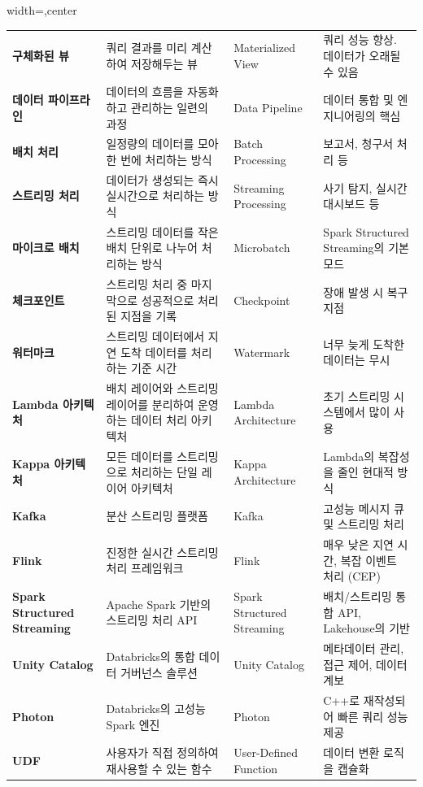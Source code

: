 \documentclass[11pt,a4paper]{article}
\begin{document}
\begin{adjustbox}{width=\textwidth,center}
\begin{tabular}{llll}
\textbf{구체화된 뷰} & 쿼리 결과를 미리 계산하여 저장해두는 뷰 & Materialized View & 쿼리 성능 향상. 데이터가 오래될 수 있음 \\
\textbf{데이터 파이프라인} & 데이터의 흐름을 자동화하고 관리하는 일련의 과정 & Data Pipeline & 데이터 통합 및 엔지니어링의 핵심 \\
\textbf{배치 처리} & 일정량의 데이터를 모아 한 번에 처리하는 방식 & Batch Processing & 보고서, 청구서 처리 등 \\
\textbf{스트리밍 처리} & 데이터가 생성되는 즉시 실시간으로 처리하는 방식 & Streaming Processing & 사기 탐지, 실시간 대시보드 등 \\
\textbf{마이크로 배치} & 스트리밍 데이터를 작은 배치 단위로 나누어 처리하는 방식 & Microbatch & Spark Structured Streaming의 기본 모드 \\
\textbf{체크포인트} & 스트리밍 처리 중 마지막으로 성공적으로 처리된 지점을 기록 & Checkpoint & 장애 발생 시 복구 지점 \\
\textbf{워터마크} & 스트리밍 데이터에서 지연 도착 데이터를 처리하는 기준 시간 & Watermark & 너무 늦게 도착한 데이터는 무시 \\
\textbf{Lambda 아키텍처} & 배치 레이어와 스트리밍 레이어를 분리하여 운영하는 데이터 처리 아키텍처 & Lambda Architecture & 초기 스트리밍 시스템에서 많이 사용 \\
\textbf{Kappa 아키텍처} & 모든 데이터를 스트리밍으로 처리하는 단일 레이어 아키텍처 & Kappa Architecture & Lambda의 복잡성을 줄인 현대적 방식 \\
\textbf{Kafka} & 분산 스트리밍 플랫폼 & Kafka & 고성능 메시지 큐 및 스트리밍 처리 \\
\textbf{Flink} & 진정한 실시간 스트리밍 처리 프레임워크 & Flink & 매우 낮은 지연 시간, 복잡 이벤트 처리 (CEP) \\
\textbf{Spark Structured Streaming} & Apache Spark 기반의 스트리밍 처리 API & Spark Structured Streaming & 배치/스트리밍 통합 API, Lakehouse의 기반 \\
\textbf{Unity Catalog} & Databricks의 통합 데이터 거버넌스 솔루션 & Unity Catalog & 메타데이터 관리, 접근 제어, 데이터 계보 \\
\textbf{Photon} & Databricks의 고성능 Spark 엔진 & Photon & C++로 재작성되어 빠른 쿼리 성능 제공 \\
\textbf{UDF} & 사용자가 직접 정의하여 재사용할 수 있는 함수 & User-Defined Function & 데이터 변환 로직을 캡슐화 \\
\bottomrule
\end{tabular}
\end{adjustbox}
\end{document}
